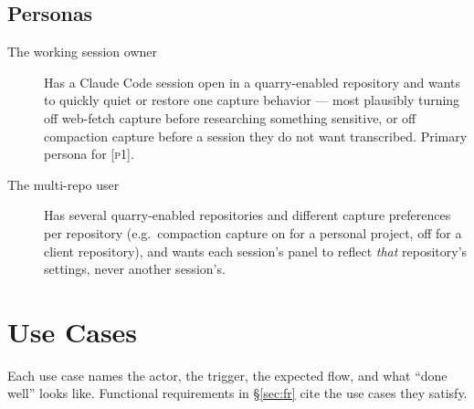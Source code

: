 \documentclass[a4paper,11pt]{report}
\newcommand{\pone}{\textsc{[p1]}}
\begin{document}
\subsection{Personas}

\begin{description}
  \item[The working session owner] Has a Claude Code session open in a
    quarry-enabled repository and wants to quickly quiet or restore one
    capture behavior --- most plausibly turning off web-fetch capture
    before researching something sensitive, or off compaction capture
    before a session they do not want transcribed. Primary persona for
    \pone{}.
  \item[The multi-repo user] Has several quarry-enabled repositories and
    different capture preferences per repository (e.g.\ compaction
    capture on for a personal project, off for a client repository), and
    wants each session's panel to reflect \emph{that} repository's
    settings, never another session's.
\end{description}

\section{Use Cases}

Each use case names the actor, the trigger, the expected flow, and what
``done well'' looks like. Functional requirements in \S\ref{sec:fr} cite
the use cases they satisfy.
\end{document}

